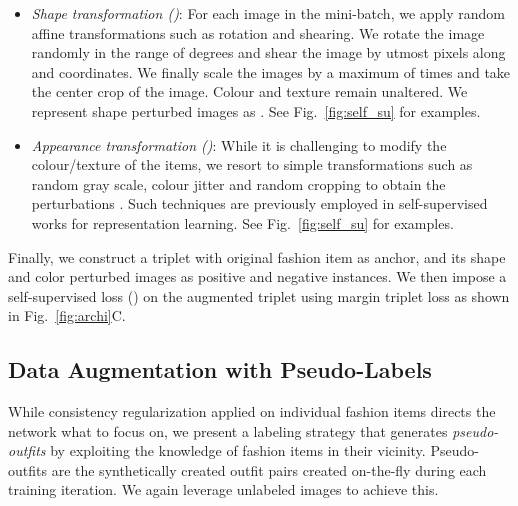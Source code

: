 \documentclass[sigconf]{acmart}
\begin{document}
\begin{itemize}
    \item \textit{Shape transformation ()}: For each image  in the mini-batch, we apply random affine transformations such as rotation and shearing. We rotate the image randomly in the range of  degrees and shear the image by utmost  pixels along  and  coordinates. We finally scale the images by a maximum of  times and take the center crop of the image. Colour and texture remain unaltered. We represent shape perturbed images as . See Fig.~\ref{fig:self_su} for examples.
    
     \item \textit{Appearance transformation ()}: 
    While it is challenging to modify the colour/texture of the items, we resort to simple transformations such as random gray scale, colour jitter and random cropping to obtain the perturbations . Such techniques are previously employed in self-supervised works \cite{moco,simclr} for representation learning. See Fig.~\ref{fig:self_su} for examples.
\end{itemize}

Finally, we construct a triplet with original fashion item  as anchor, and its shape  and color  perturbed images as positive and negative instances. We then impose a self-supervised loss () on the augmented triplet  using margin triplet loss as shown in Fig.~\ref{fig:archi}{C}.

\subsection{Data Augmentation with Pseudo-Labels}

\label{sec:l_pseudo}
While consistency regularization applied on individual fashion items directs the network what to focus on, we present a labeling strategy that generates {\em pseudo-outfits} by exploiting the knowledge of fashion items in their vicinity. Pseudo-outfits are the synthetically created outfit pairs created on-the-fly during each training iteration. We again leverage unlabeled images to achieve this.
\end{document}
